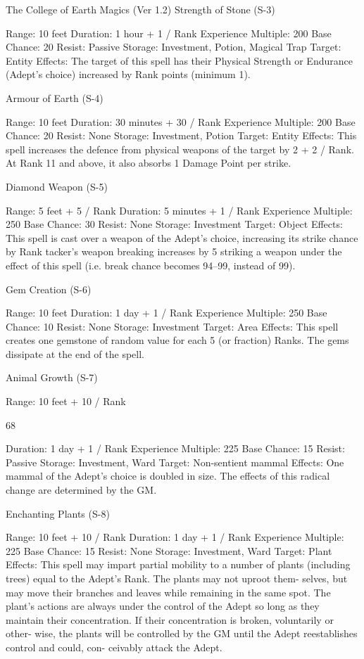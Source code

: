\begin{Chapter}{The College of Earth Magics (Ver 1.2)}
Strength of Stone (S-3) 

Range: 10 feet 
Duration: 1 hour + 1 / Rank 
Experience Multiple: 200 
Base Chance: 20%
Resist: Passive 
Storage: Investment, Potion, Magical Trap 
Target: Entity 
Effects:  The  target  of  this  spell  has  their  Physical 
Strength  or  Endurance  (Adept’s  choice)  increased 
by Rank points (minimum 1). 

Armour of Earth (S-4) 

Range: 10 feet 
Duration: 30 minutes + 30 / Rank 
Experience Multiple: 200 
Base Chance: 20%
Resist: None 
Storage: Investment, Potion 
Target: Entity 
Effects:  This  spell  increases  the  defence  from 
physical weapons of the target by 2 + 2 / Rank. At 
Rank 11 and above, it also absorbs 1 Damage Point 
per strike. 

Diamond Weapon (S-5) 

Range: 5 feet + 5 / Rank 
Duration: 5 minutes + 1 / Rank 
Experience Multiple: 250 
Base Chance: 30%
Resist: None 
Storage: Investment 
Target: Object 
Effects:  This  spell  is  cast  over  a  weapon  of  the 
Adept’s  choice,  increasing  its  strike  chance  by 
Rank%
tacker’s  weapon  breaking  increases  by  5%
striking a weapon under the effect of this spell (i.e. 
break chance becomes 94–99, instead of 99). 

Gem Creation (S-6) 

Range: 10 feet 
Duration: 1 day + 1 / Rank 
Experience Multiple: 250 
Base Chance: 10%
Resist: None 
Storage: Investment 
Target: Area 
Effects: This spell creates one gemstone of random 
value  for  each  5  (or  fraction)  Ranks.  The  gems 
dissipate at the end of the spell. 

Animal Growth (S-7) 

Range: 10 feet + 10 / Rank 

68 

Duration: 1 day + 1 / Rank 
Experience Multiple: 225 
Base Chance: 15%
Resist: Passive 
Storage: Investment, Ward 
Target: Non-sentient mammal 
Effects:  One  mammal  of  the  Adept’s  choice  is 
doubled  in  size.  The  effects  of  this  radical  change 
are determined by the GM. 

Enchanting Plants (S-8) 

Range: 10 feet + 10 / Rank 
Duration: 1 day + 1 / Rank 
Experience Multiple: 225 
Base Chance: 15%
Resist: None 
Storage: Investment, Ward 
Target: Plant 
Effects: This spell may impart partial mobility to a 
number  of  plants  (including  trees)  equal  to  the 
Adept’s  Rank.  The  plants  may  not  uproot  them-
selves,  but  may  move  their  branches  and  leaves 
while  remaining  in  the  same  spot.  The  plant’s 
actions  are  always  under  the  control  of  the  Adept 
so  long  as  they  maintain  their  concentration.  If 
their  concentration  is  broken,  voluntarily  or  other-
wise, the plants will be controlled by the GM until 
the  Adept  reestablishes  control  and  could,  con-
ceivably attack the Adept. 


\end{Chapter}
